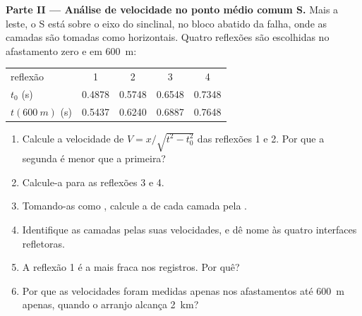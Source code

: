\begin{problem}
\noindent\textbf{Parte II --- Análise de velocidade no ponto médio comum S.} Mais a leste, o  S
está sobre o eixo do sinclinal, no bloco abatido da falha, onde
as camadas são tomadas como horizontais. Quatro reflexões são escolhidas no afastamento zero e em
\qty{600}{m}:
\begin{center}
\small
\begin{tabular}{lcccc}
\hline
reflexão & 1 & 2 & 3 & 4 \\
$t_0$ (\unit{s}) & 0.4878 & 0.5748 & 0.6548 & 0.7348 \\
$t(\qty{600}{m})$ (\unit{s}) & 0.5437 & 0.6240 & 0.6887 & 0.7648 \\
\hline
\end{tabular}
\end{center}
\begin{enumerate}[resume]
  \item Calcule a velocidade de  $V = x/\sqrt{t^2 - t_0^2}$ das reflexões 1
        e 2. Por que a segunda é menor que a primeira?
  \item Calcule-a para as reflexões 3 e 4.
  \item Tomando-as como , calcule a  de cada
        camada pela .
  \item Identifique as camadas pelas suas velocidades, e dê nome às quatro
        interfaces refletoras.
  \item A reflexão 1 é a mais fraca nos registros. Por quê?
  \item Por que as velocidades foram medidas apenas nos afastamentos até \qty{600}{m}
        apenas, quando o arranjo alcança \qty{2}{km}?
\end{enumerate}


\end{problem}
